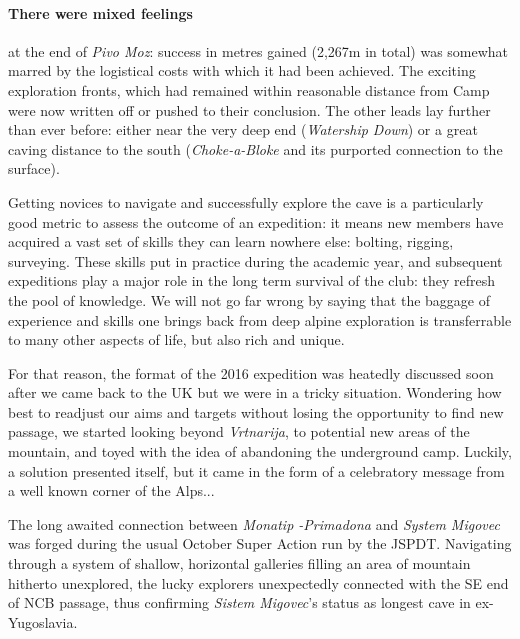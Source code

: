 \newpage

\begin{tcolorbox}
	\paragraph{There were mixed feelings} at the end of \emph{Pivo Moz}: success in metres gained (2,267m in total) was somewhat marred by the logistical costs with which it had been achieved. The exciting exploration fronts, which had remained within reasonable distance from Camp were now written off or pushed to their conclusion. The other leads lay further than ever before: either near the very deep end (\emph{Watership Down}) or a great caving distance to the south (\emph{Choke-a-Bloke} and its purported connection to the surface).

	Getting novices to navigate and successfully explore the cave is a particularly good metric to assess the outcome of an expedition: it means new members have acquired a vast set of skills they can learn nowhere else: bolting, rigging, surveying. These skills put in practice during the academic year, and subsequent expeditions play a major role in the long term survival of the club: they refresh the pool of knowledge. We will not go far wrong by saying that the baggage of experience and skills one brings back from deep alpine exploration is transferrable to many other aspects of life, but also rich and unique.

	For that reason, the format of the 2016 expedition was heatedly discussed soon after we came back to the UK but we were in a tricky situation. Wondering how best to readjust our aims and targets without losing the opportunity to find new passage, we started looking beyond \emph{Vrtnarija}, to potential new areas of the mountain, and toyed with the idea of abandoning the underground camp. Luckily, a solution presented itself, but it came in the form of a celebratory message from a well known corner of the Alps...

	The long awaited connection between \emph{Monatip -Primadona} and \emph{System Migovec} was forged during the usual October Super Action run by the JSPDT. Navigating through a system of shallow, horizontal galleries filling an area of mountain hitherto unexplored, the lucky explorers unexpectedly connected with the SE end of NCB passage, thus confirming \emph{Sistem Migovec}'s status as longest cave in ex-Yugoslavia.
	\\
	\\
	\\
	
	
\end{tcolorbox}
\BgThispage